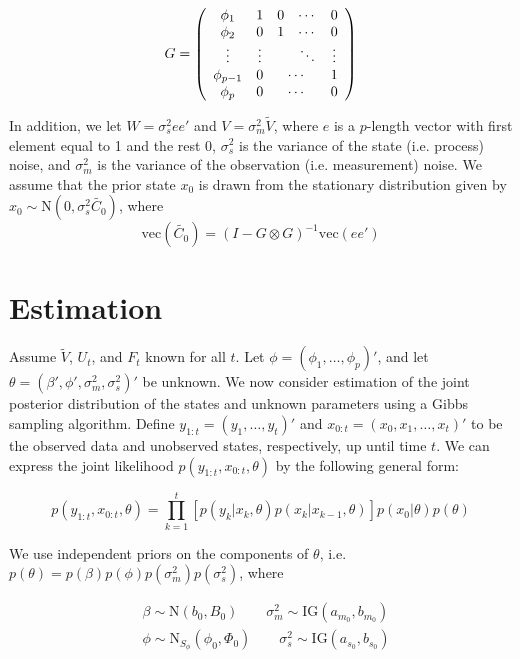 \documentclass{article}
\begin{document}
\[G = \left(
\begin{array}{ccccc}
\phi_1 & 1 & 0 & \cdots & 0 \\
\phi_2 & 0 & 1 & \cdots & 0 \\
\vdots & \vdots & & \ddots & \vdots \\
\phi_{p-1} & 0 & \multicolumn{2}{c}{\cdots} & 1 \\
\phi_p & 0 & \multicolumn{2}{c}{\cdots} & 0
\end{array}
\right)\]

\noindent In addition, we let $W = \sigma^2_see'$ and $V = \sigma^2_m\tilde{V}$, where $e$ is a $p$-length vector with first element equal to 1 and the rest 0, $\sigma^2_s$ is the variance of the state (i.e. process) noise, and $\sigma^2_m$ is the variance of the observation (i.e. measurement) noise. We assume that the prior state $x_0$ is drawn from the stationary distribution given by $x_0 \sim \mbox{N}(0, \sigma^2_s\tilde{C_0})$, where \[\mbox{vec}({\tilde{C_0}}) = (I - G \otimes G)^{-1}\mbox{vec}(ee')\]

\section{Estimation}

Assume $\tilde{V}$, $U_t$, and $F_t$ known for all $t$. Let $\phi = (\phi_1,\ldots,\phi_p)'$, and let $\theta = (\beta', \phi', \sigma^2_m, \sigma^2_s)'$ be unknown. We now consider estimation of the joint posterior distribution of the states and unknown parameters using a Gibbs sampling algorithm. Define $y_{1:t} = (y_1,\ldots,y_t)'$ and $x_{0:t} = (x_0,x_1,\ldots,x_t)'$ to be the observed data and unobserved states, respectively, up until time $t$. We can express the joint likelihood $p(y_{1:t},x_{0:t},\theta)$ by the following general form:

\begin{equation}
p(y_{1:t},x_{0:t},\theta) = \prod_{k=1}^t\left[p(y_k|x_k,\theta)p(x_k|x_{k-1},\theta)\right]p(x_0|\theta)p(\theta) \label{eqn:lik}
\end{equation}

\noindent We use independent priors on the components of $\theta$, i.e. $p(\theta) = p(\beta)p(\phi)p(\sigma^2_m)p(\sigma^2_s)$, where

\begin{align*}
&\beta \sim \mbox{N}(b_0, B_0) \qquad \sigma^2_m \sim \mbox{IG}(a_{m_0}, b_{m_0})\\
&\phi \sim \mbox{N}_{S_\phi}(\phi_0, \Phi_0) \qquad \sigma^2_s \sim \mbox{IG}(a_{s_0}, b_{s_0})
\end{align*}
\end{document}
